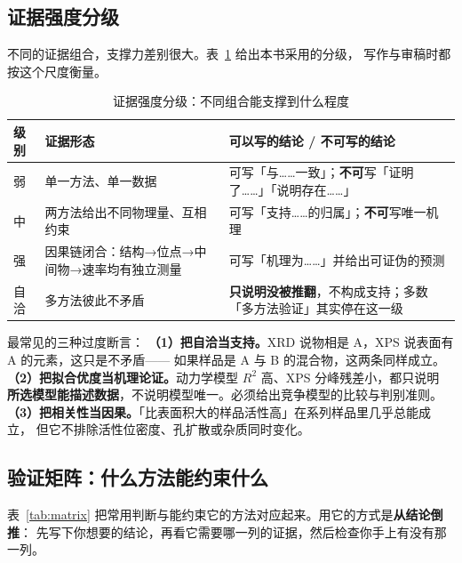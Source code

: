 \subsection{证据强度分级}

不同的证据组合，支撑力差别很大。表~\ref{tab:evidence-level} 给出本书采用的分级，
写作与审稿时都按这个尺度衡量。

\begin{table}[htbp]
\centering
\caption{证据强度分级：不同组合能支撑到什么程度}
\label{tab:evidence-level}
{\srcsize
\begin{tabularx}{\columnwidth}{@{}lXX@{}}
\toprule
级别 & 证据形态 & 可以写的结论 / 不可写的结论 \\
\midrule
弱 & 单一方法、单一数据 & 可写「与……一致」；\textbf{不可}写「证明了……」「说明存在……」 \\
中 & 两方法给出不同物理量、互相约束 & 可写「支持……的归属」；\textbf{不可}写唯一机理 \\
强 & 因果链闭合：结构→位点→中间物→速率均有独立测量 & 可写「机理为……」并给出可证伪的预测 \\
自洽 & 多方法彼此不矛盾 & \textbf{只说明没被推翻}，不构成支持；多数「多方法验证」其实停在这一级 \\
\bottomrule
\end{tabularx}}
\end{table}

\begin{pitfall}
最常见的三种过度断言：
\textbf{（1）把自洽当支持。}XRD 说物相是 A，XPS 说表面有 A 的元素，这只是不矛盾——
如果样品是 A 与 B 的混合物，这两条同样成立。
\textbf{（2）把拟合优度当机理论证。}动力学模型 $R^2$ 高、XPS 分峰残差小，都只说明
\textbf{所选模型能描述数据}，不说明模型唯一。必须给出竞争模型的比较与判别准则。
\textbf{（3）把相关性当因果。}「比表面积大的样品活性高」在系列样品里几乎总能成立，
但它不排除活性位密度、孔扩散或杂质同时变化。
\end{pitfall}

\subsection{验证矩阵：什么方法能约束什么}

表~\ref{tab:matrix} 把常用判断与能约束它的方法对应起来。用它的方式是\textbf{从结论倒推}：
先写下你想要的结论，再看它需要哪一列的证据，然后检查你手上有没有那一列。

